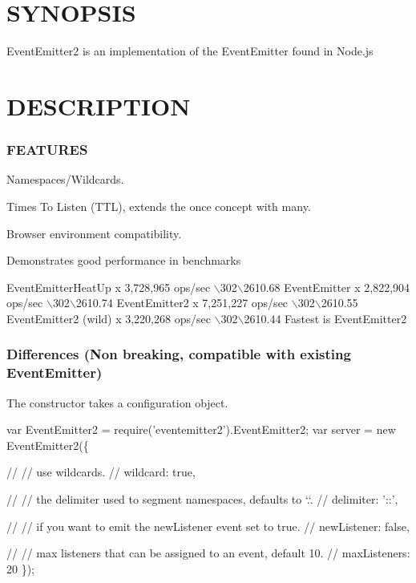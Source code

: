\href{https://www.codeship.io/projects/11259}{\tt }

\section*{S\+Y\+N\+O\+P\+S\+IS}

Event\+Emitter2 is an implementation of the Event\+Emitter found in Node.\+js

\section*{D\+E\+S\+C\+R\+I\+P\+T\+I\+ON}

\subsubsection*{F\+E\+A\+T\+U\+R\+ES}


\begin{DoxyItemize}
\item Namespaces/\+Wildcards.
\item Times To Listen (T\+TL), extends the {\ttfamily once} concept with {\ttfamily many}.
\item Browser environment compatibility.
\item Demonstrates good performance in benchmarks
\end{DoxyItemize}


\begin{DoxyCode}
EventEmitterHeatUp x 3,728,965 ops/sec \(\backslash\)302\(\backslash\)2610.68%
EventEmitter x 2,822,904 ops/sec \(\backslash\)302\(\backslash\)2610.74%
EventEmitter2 x 7,251,227 ops/sec \(\backslash\)302\(\backslash\)2610.55%
EventEmitter2 (wild) x 3,220,268 ops/sec \(\backslash\)302\(\backslash\)2610.44%
Fastest is EventEmitter2
\end{DoxyCode}


\subsubsection*{Differences (Non breaking, compatible with existing Event\+Emitter)}


\begin{DoxyItemize}
\item The constructor takes a configuration object.
\end{DoxyItemize}


\begin{DoxyCode}
var EventEmitter2 = require('eventemitter2').EventEmitter2;
var server = new EventEmitter2(\{

  //
  // use wildcards.
  //
  wildcard: true,

  //
  // the delimiter used to segment namespaces, defaults to `.`.
  //
  delimiter: '::', 

  //
  // if you want to emit the newListener event set to true.
  //
  newListener: false, 

  //
  // max listeners that can be assigned to an event, default 10.
  //
  maxListeners: 20
\});
\end{DoxyCode}



